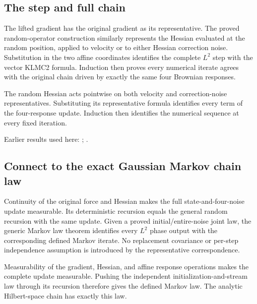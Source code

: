 \documentclass[11pt,a4paper]{report}
\begin{document}
\subsection{\texorpdfstring{The step and full chain}{The step and full chain}}
\label{report-step-KineticLangevin-LpKLMC2-lean-2}


The lifted gradient has the original gradient as its representative. The proved random-operator construction similarly represents the Hessian evaluated at the random position, applied to velocity or to either Hessian correction noise. Substitution in the two affine coordinates identifies the complete \(L^{2}\) step with the vector KLMC2 formula. Induction then proves every numerical iterate agrees with the original chain driven by exactly the same four Brownian responses.



The random Hessian acts pointwise on both velocity and correction-noise representatives. Substituting its representative formula identifies every term of the four-response update. Induction then identifies the numerical sequence at every fixed iteration.



Earlier results used here: \cite[Section~3.13.2]{LangevinLean2026ULASC}; \cite[Section~3.13.3]{LangevinLean2026ULASC}.
\subsection{\texorpdfstring{Connect to the exact Gaussian Markov chain law}{Connect to the exact Gaussian Markov chain law}}
\label{report-step-KineticLangevin-LpKLMC2-lean-3}


Continuity of the original force and Hessian makes the full state-and-four-noise update measurable. Its deterministic recursion equals the general random recursion with the same update. Given a proved initial/\allowbreak{}entire-noise joint law, the generic Markov law theorem identifies every \(L^{2}\) phase output with the corresponding defined Markov iterate. No replacement covariance or per-step independence assumption is introduced by the representative correspondence.



Measurability of the gradient, Hessian, and affine response operations makes the complete update measurable. Pushing the independent initialization-and-stream law through its recursion therefore gives the defined Markov law. The analytic Hilbert-space chain has exactly this law.
\end{document}
